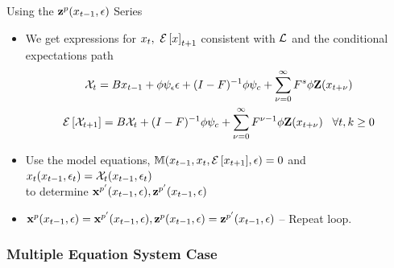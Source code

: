 \documentclass[12pt]{article}
\begin{document}
{Using the $\mathbf{z}^p(x_{t-1},\epsilon)$ Series}
{\small
  \begin{itemize}
  \item We get expressions for $x_t,\,\, {\mathcal{E}\left [ x \right ]}_{t+1}$ consistent with ${\mathcal{L}}$ and the conditional expectations path
   \begin{gather*}
     \mathcal{X}_{t} =B x_{t-1}+ \phi \psi_\epsilon\epsilon + (I - F)^{-1} \phi \psi_c + \sum_{{\nu}=0}^\infty F^s \phi \mathbf{Z}(x_{t+\nu})\\
	{\mathcal{E}\left [  \mathcal{X}_{t+1} \right ]} =B \mathcal{X}_{t}  + (I - F)^{-1} \phi \psi_c+ \sum_{{\nu} =0}^\infty F^{{\nu}-1} \phi \mathbf{Z}(x_{t+\nu}) \,\,\,\,\,\forall t,k \ge  0
\end{gather*}
\item Use the model equations, $\mathbb{M}(x_{t-1},x_t,{\mathcal{E}\left [ x_{t+1} \right ]},\epsilon)=0$ and $x_t(x_{t-1},\epsilon_t)=\mathcal{X}_t(x_{t-1},\epsilon_t)$\\ to determine $\mathbf{x}^{p'}(x_{t-1},\epsilon), \mathbf{z}^{p'}(x_{t-1},\epsilon)$
\item $\mathbf{x}^p(x_{t-1},\epsilon)=\mathbf{x}^{p'}(x_{t-1},\epsilon), \mathbf{z}^p(x_{t-1},\epsilon)=\mathbf{z}^{p'}(x_{t-1},\epsilon)$ -- {\color{blue}Repeat loop.}
  \end{itemize}
}

\subsubsection{Multiple Equation System Case}
\end{document}

